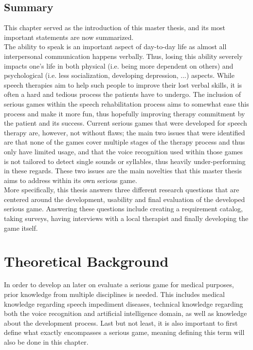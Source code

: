 \documentclass[draft,final]{vutinfth} %
\begin{document}
\section{Summary}
This chapter served as the introduction of this master thesis, and its most important statements are now summarized. \\
The ability to speak is an important aspect of day-to-day life as almost all interpersonal communication happens verbally. Thus, losing this ability severely impacts one's life in both physical (i.e. being more dependent on others) and psychological (i.e. less  socialization, developing depression, ...) aspects. While speech therapies aim to help such people to improve their lost verbal skills, it is often a hard and tedious process the patients have to undergo. The inclusion of serious games within the speech rehabilitation process aims to somewhat ease this process and make it more fun, thus hopefully improving therapy commitment by the patient and its success. Current serious games that were developed for speech therapy are, however, not without flaws; the main two issues that were identified are that none of the games cover multiple stages of the therapy process and thus only have limited usage, and that the voice recognition used within those games is not tailored to detect single sounds or syllables, thus heavily under-performing in these regards. These two issues are the main novelties that this master thesis aims to address within its own serious game. \\
More specifically, this thesis answers three different research questions that are centered around the development, usability and final evaluation of the developed serious game. Answering these questions include creating a requirement catalog, taking surveys, having interviews with a local therapist and finally developing the game itself.
\\

\chapter{Theoretical Background}
\label{chap:theory}
In order to develop an later on evaluate a serious game for medical purposes, prior knowledge from multiple disciplines is needed. This includes medical knowledge regarding speech impediment diseases, technical knowledge regarding both the voice recognition and artificial intelligence domain, as well as knowledge about the development process. Last but not least, it is also important to first define what exactly encompasses a serious game, meaning defining this term will also be done in this chapter.
\end{document}
